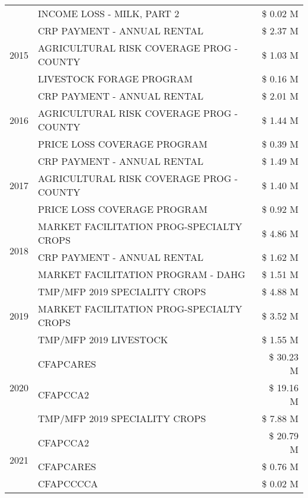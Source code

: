 \begin{tabular}{llr}
 & INCOME LOSS - MILK, PART 2 & \$ 0.02 M \\
\cline{1-3}
\multirow[t]{3}{*}{2015} & CRP PAYMENT - ANNUAL RENTAL & \$ 2.37 M \\
 & AGRICULTURAL RISK COVERAGE PROG - COUNTY & \$ 1.03 M \\
 & LIVESTOCK FORAGE PROGRAM & \$ 0.16 M \\
\cline{1-3}
\multirow[t]{3}{*}{2016} & CRP PAYMENT - ANNUAL RENTAL & \$ 2.01 M \\
 & AGRICULTURAL RISK COVERAGE PROG - COUNTY & \$ 1.44 M \\
 & PRICE LOSS COVERAGE PROGRAM & \$ 0.39 M \\
\cline{1-3}
\multirow[t]{3}{*}{2017} & CRP PAYMENT - ANNUAL RENTAL & \$ 1.49 M \\
 & AGRICULTURAL RISK COVERAGE PROG - COUNTY & \$ 1.40 M \\
 & PRICE LOSS COVERAGE PROGRAM & \$ 0.92 M \\
\cline{1-3}
\multirow[t]{3}{*}{2018} & MARKET FACILITATION PROG-SPECIALTY CROPS & \$ 4.86 M \\
 & CRP PAYMENT - ANNUAL RENTAL & \$ 1.62 M \\
 & MARKET FACILITATION PROGRAM - DAHG & \$ 1.51 M \\
\cline{1-3}
\multirow[t]{3}{*}{2019} & TMP/MFP 2019 SPECIALITY CROPS & \$ 4.88 M \\
 & MARKET FACILITATION PROG-SPECIALTY CROPS & \$ 3.52 M \\
 & TMP/MFP 2019 LIVESTOCK & \$ 1.55 M \\
\cline{1-3}
\multirow[t]{3}{*}{2020} & CFAPCARES & \$ 30.23 M \\
 & CFAPCCA2 & \$ 19.16 M \\
 & TMP/MFP 2019 SPECIALITY CROPS & \$ 7.88 M \\
\cline{1-3}
\multirow[t]{3}{*}{2021} & CFAPCCA2 & \$ 20.79 M \\
 & CFAPCARES & \$ 0.76 M \\
 & CFAPCCCCA & \$ 0.02 M \\
\cline{1-3}
\bottomrule
\end{tabular}
